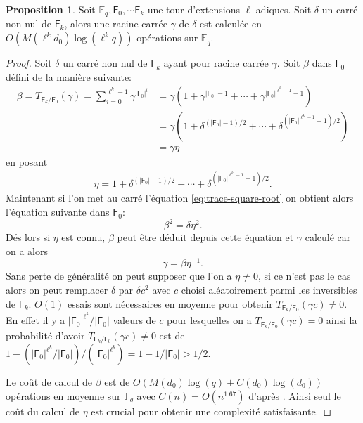 \documentclass[10pt,a4paper]{book}
\theoremstyle{plain}
\theoremstyle{definition}
\theoremstyle{definition}
\theoremstyle{definition}
\newtheorem{prop}[thm]{Proposition}
\theoremstyle{definition}
\theoremstyle{remark}
\theoremstyle{remark}
\begin{document}
\begin{prop}
Soit $\mathbb{F}_q, \mathsf{F}_0, \cdots \mathsf{F}_k$ une tour d'extensions $\ell$-adiques. Soit $\delta$ un carré non nul de $\mathsf{F}_k$, alors une racine carrée $\gamma$ de $\delta$ est calculée en $O(M(\ell^kd_0)\log(\ell^kq))$ opérations sur $\mathbb{F}_q$.
\end{prop}

\begin{proof}
Soit $\delta$ un carré non nul de $\mathsf{F}_k$ ayant pour racine carrée $\gamma$. Soit $\beta$ dans $\mathsf{F}_0$ défini de la manière suivante:
\begin{align}
\label{eq:trace-square-root}
\beta=T_{\mathsf{F}_k/\mathsf{F}_0}(\gamma)=\sum_{i=0}^{\ell^k-1}\gamma^{|\mathsf{F}_0|^i}&=\gamma(1+\gamma^{|\mathsf{F}_0|-1}+\cdots+ \gamma^{|\mathsf{F}_0|^{\ell^k-1}-1} ) \\
&=\gamma(1+\delta^{(|\mathsf{F}_0|-1)/2}+\cdots+ \delta^{(|\mathsf{F}_0|^{\ell^k-1}-1)/2}) \\
&=\gamma \eta
\end{align}
en posant 
\begin{align*}
\eta=1+\delta^{(|\mathsf{F}_0|-1)/2}+\cdots+ \delta^{(|\mathsf{F}_0|^{\ell^k-1}-1)/2}.
\end{align*}
Maintenant si l'on met au carré l'équation \eqref{eq:trace-square-root} on obtient alors l'équation suivante dans $\mathsf{F}_0$: 
\begin{equation*}
\beta^2=\delta \eta^2. 
\end{equation*}
Dés lors si $\eta$ est connu, $\beta$ peut être déduit depuis cette équation et $\gamma$ calculé car on a alors
\begin{equation*}
 \gamma=\beta \eta^{-1}.
\end{equation*}
Sans perte de généralité on peut supposer que l'on a $\eta \neq 0$, si ce n'est pas le cas alors on peut remplacer $\delta$ par $\delta c^2$ avec $c$ choisi aléatoirement parmi les inversibles de $\mathsf{F}_k$.
$O(1)$ essais sont nécessaires en moyenne pour obtenir $T_{\mathsf{F}_k/\mathsf{F}_0}(\gamma c) \neq 0$. En effet il y a $|\mathsf{F}_0|^{\ell^k}/|\mathsf{F}_0|$ valeurs de $c$ pour lesquelles on a $T_{\mathsf{F}_k/\mathsf{F}_0}(\gamma c) = 0$ ainsi la probabilité d'avoir $T_{\mathsf{F}_k/\mathsf{F}_0}(\gamma c) \neq 0$ est de $1-(|\mathsf{F}_0|^{\ell^k}/|\mathsf{F}_0|)/(|\mathsf{F}_0|^{\ell^k})=1-1/|\mathsf{F}_0|>1/2$.

Le coût de calcul de $\beta$ est de $O(M(d_0)\log(q)+C(d_0)\log(d_0))$ opérations en moyenne sur $\mathbb{F}_q$ avec $C(n)=O(n^{1.67})$ d'après \cite{doliskani_Schost_2014_root}. Ainsi seul le coût du calcul de $\eta$ est crucial pour obtenir une complexité satisfaisante.


\end{proof}
\end{document}
